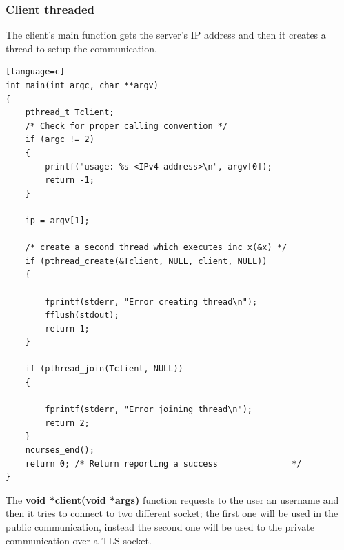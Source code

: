 \documentclass[a4paper,12pt]{article}
\begin{document}
\subsubsection{Client threaded}
The client's main function gets the server's IP address and then it creates a thread to setup the communication.
\begin{lstlisting}[caption={int main(int argc, char **argv) of TLS client},captionpos=b][language=c]
int main(int argc, char **argv)
{
    pthread_t Tclient;
    /* Check for proper calling convention */
    if (argc != 2)
    {
        printf("usage: %s <IPv4 address>\n", argv[0]);
        return -1;
    }

    ip = argv[1];

    /* create a second thread which executes inc_x(&x) */
    if (pthread_create(&Tclient, NULL, client, NULL))
    {

        fprintf(stderr, "Error creating thread\n");
        fflush(stdout);
        return 1;
    }

    if (pthread_join(Tclient, NULL))
    {

        fprintf(stderr, "Error joining thread\n");
        return 2;
    }
    ncurses_end();
    return 0; /* Return reporting a success               */
}
\end{lstlisting}
The \textbf{void *client(void *args)} function requests to the user an username and then it tries to connect to two different socket; the first one will be used in the public communication, instead the second one will be used to the private communication over a TLS socket.
\end{document}
